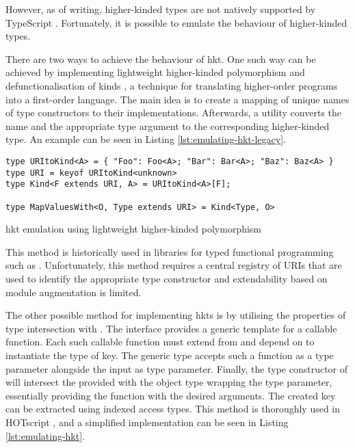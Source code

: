 However, as of writing, higher-kinded types are not natively supported by TypeScript \cite{DocumentationTypeScriptFunctional}. Fortunately, it is possible to emulate the behaviour of higher-kinded types.

There are two ways to achieve the behaviour of \acrshort{hkt}. One such way can be achieved by implementing lightweight higher-kinded polymorphism \cite{yallopLightweightHigherKindedPolymorphism2014} and defunctionalisation of kinds \cite{reynoldsDefinitionalInterpretersHigherorder1972}, a technique for translating higher-order programs into a first-order language. The main idea is to create a mapping of unique names of type constructors to their implementations. Afterwards, a  utility converts the name and the appropriate type argument to the corresponding higher-kinded type. An example can be seen in Listing \ref{lst:emulating-hkt-legacy}.

\begin{listing}[ht]
  \begin{verbatim}
type URItoKind<A> = { "Foo": Foo<A>; "Bar": Bar<A>; "Baz": Baz<A> }
type URI = keyof URItoKind<unknown>
type Kind<F extends URI, A> = URItoKind<A>[F];

type MapValuesWith<O, Type extends URI> = Kind<Type, O>
\end{verbatim}
  \caption{\acrshort{hkt} emulation using lightweight higher-kinded polymorphism}\label{lst:emulating-hkt-legacy}
\end{listing}

This method is historically used in libraries for typed functional programming such as  \cite{GcantiFptsFunctional}. Unfortunately, this method requires a central registry of URIs that are used to identify the appropriate type constructor and extendability based on module augmentation is limited.

The other possible method for implementing \acrshort{hkt}s is by utilising the properties of type intersection with . The interface  provides a generic template for a callable function. Each such callable function must extend from  and depend on  to instantiate the type of  key. The  generic type accepts such a function as a type parameter  alongside the input as  type parameter. Finally, the type constructor of  will intersect the provided  with the object type wrapping the  type parameter, essentially providing the function with the desired arguments. The created  key can be extracted using indexed access types. This method is thoroughly used in HOTscript \cite{vergnaudHigherOrderTypeScriptHOTScript2023}, and a simplified implementation can be seen in Listing \ref{lst:emulating-hkt}.

